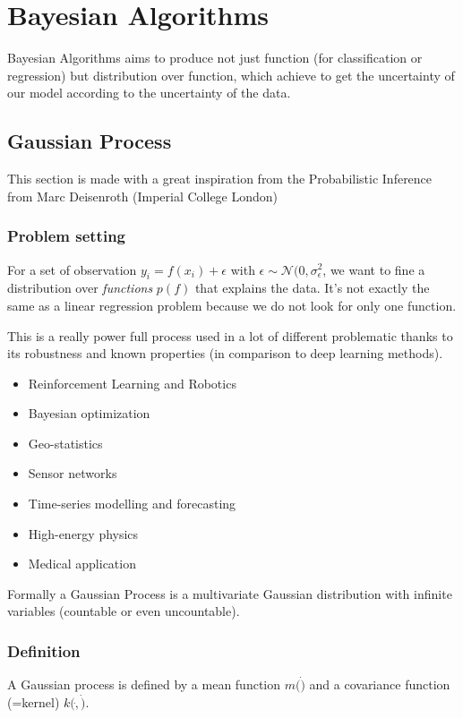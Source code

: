 \chapter{Bayesian Algorithms} %
\label{cha:bayesian_algorithms}

	Bayesian Algorithms aims to produce not just function (for classification or regression) but distribution over function, which achieve to get the uncertainty of our model according to the uncertainty of the data.

	\section{Gaussian Process}

		This section is made with a great inspiration from the Probabilistic Inference from Marc Deisenroth (Imperial College London)
		\subsection{Problem setting} %
		\label{sub:problem_setting}
			For a set of observation $y_i = f(x_i) + \epsilon$ with $\epsilon \sim \mathcal{N}(0, \sigma_\epsilon^2$, we want to fine a distribution over \emph{functions} $p(f)$ that explains the data. It's not exactly the same as a linear regression problem because we do not look for only one function.

			This is a really power full process used in a lot of different problematic thanks to its robustness and known properties (in comparison to deep learning methods).

			\begin{itemize}
				\item Reinforcement Learning and Robotics
				\item Bayesian optimization
				\item Geo-statistics 
				\item Sensor networks
				\item Time-series modelling and forecasting
				\item High-energy physics
				\item Medical application
			\end{itemize}

			Formally a Gaussian Process is a multivariate Gaussian distribution with infinite variables (countable or even uncountable).

		\subsection{Definition} %
		\label{sub:definition}
			A Gaussian process is defined by a mean function $m(\dot)$ and a covariance function (=kernel) $k(\dot, \dot)$.

